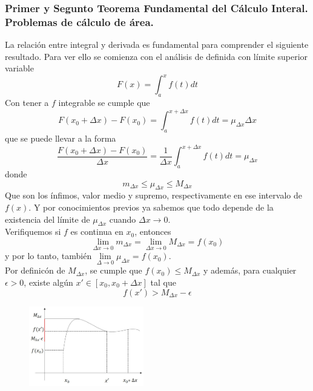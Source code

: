 \documentclass[10pt,twoside]{SelfArx} %
\begin{document}
 \subsubsection{Primer y Segunto Teorema Fundamental del Cálculo Interal. Problemas de cálculo de área.}
La relación entre integral y derivada es fundamental para comprender el siguiente resultado. Para ver ello se comienza con el análisis de definida con límite superior variable
\[ F(x)=\int_{a}^{x}f(t)dt \]
Con tener a $ f $ integrable se cumple que 
\begin{equation}
\displaystyle F(x_{0}+\Delta x)-F(x_{0})=\int_{a}^{x+\Delta x}f(t)dt=\mu_{\Delta x}\Delta x
\end{equation}
que se puede llevar a la forma
\begin{equation}
\displaystyle \dfrac{F(x_{0}+\Delta x)-F(x_{0})}{\Delta x}=\dfrac{1}{\Delta x}\int_{a}^{x+\Delta x}f(t)dt=\mu_{\Delta x}
\end{equation}
donde 
\[ m_{\Delta x}\leq \mu_{\Delta x}\leq M_{\Delta x} \]
Que son los ínfimos, valor medio y supremo, respectivamente en ese intervalo de $ f(x) $. Y por conocimientos previos ya sabemos que todo depende de la existencia del límite de $ \mu_{\Delta x} $ cuando $ \Delta x\rightarrow0 $. \\
Verifiquemos si $ f $ es continua en $ x_{0} $, entonces
\[ \lim\limits_{\Delta x\rightarrow0}m_{\Delta x}=\lim\limits_{\Delta x\rightarrow0}M_{\Delta x}=f(x_{0}) \]
y por lo tanto, también $ \lim\limits_{\Delta \rightarrow0}\mu_{\Delta x}=f(x_{0}) $.
\\Por definicón  de $ M_{\Delta x} $, se cumple que $ f(x_{0})\leq M_{\Delta x} $ y además, para cualquier $ \epsilon>0 $, existe algún $ x'\in[x_{0},x_{0}+\Delta x] $ tal que 
\[ f(x')>M_{\Delta x}-\epsilon \]


 \begin{figure}[h]
 	\centering
 	\includegraphics[width=5cm]{integracion7}
 	\caption{}
 	\label{integracion7}
 \end{figure}
\end{document}
